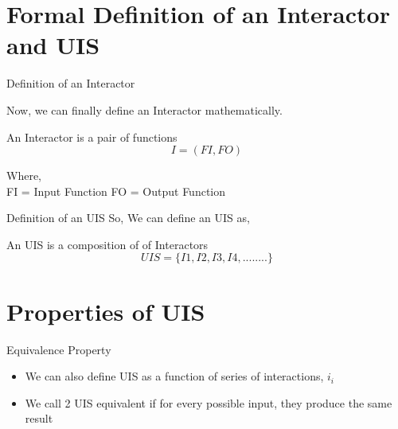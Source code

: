 \documentclass{beamer}
\begin{document}
\section{Formal Definition of an Interactor and UIS}
\begin{frame}{Definition of an Interactor}
	
	Now, we can finally define an Interactor mathematically.
	\begin{block}{An Interactor is a pair of functions}
		$$ I = (FI,FO) $$
	\end{block}
	
	Where,\\
	
	 FI = Input Function 
	 FO = Output Function 
	
	
\end{frame}

\begin{frame}{Definition of an UIS}
So, We can define an UIS as,
\begin{block}{An UIS is a composition of of Interactors}
	$$ UIS =  \{I1,I2,I3,I4,........\}  $$
\end{block}
 
\end{frame}


	\section{Properties of UIS}
	\begin{frame}{Equivalence Property}
		\begin{itemize}
			\item We can also define UIS as a function of series of interactions, $i_i$\\
			\item We call 2 UIS equivalent if for every possible input, they produce the same result
		\end{itemize}
	\end{frame}
\end{document}
